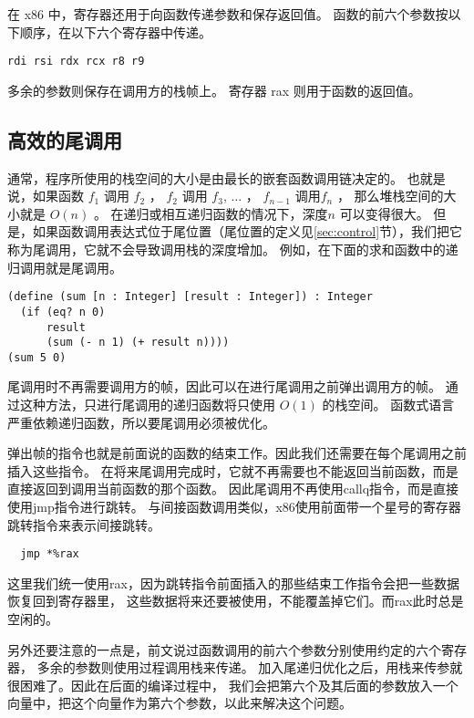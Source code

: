 在 x86 中，寄存器还用于向函数传递参数和保存返回值。
函数的前六个参数按以下顺序，在以下六个寄存器中传递。

\begin{lstlisting}
rdi rsi rdx rcx r8 r9
\end{lstlisting}

多余的参数则保存在调用方的栈帧上。
寄存器 rax 则用于函数的返回值。

\subsection{高效的尾调用}
\label{subsec:tail-call}

通常，程序所使用的栈空间的大小是由最长的嵌套函数调用链决定的。
也就是说，如果函数
$f_1$ 调用 $f_2$ ， $f_2$ 调用 $f_3$, $\ldots$ ， $f_{n-1}$ 调用$f_n$ ，
那么堆栈空间的大小就是 $O(n)$ 。
在递归或相互递归函数的情况下，深度$n$ 可以变得很大。
但是，如果函数调用表达式位于尾位置（尾位置的定义见\ref{sec:control}节），我们把它称为尾调用，它就不会导致调用栈的深度增加。
例如，在下面的求和函数中的递归调用就是尾调用。

\begin{lstlisting}
(define (sum [n : Integer] [result : Integer]) : Integer
  (if (eq? n 0)
      result
      (sum (- n 1) (+ result n))))
(sum 5 0)
\end{lstlisting}

尾调用时不再需要调用方的帧，因此可以在进行尾调用之前弹出调用方的帧。
通过这种方法，只进行尾调用的递归函数将只使用 $O(1)$ 的栈空间。
函数式语言严重依赖递归函数，所以要尾调用必须被优化。

弹出帧的指令也就是前面说的函数的结束工作。因此我们还需要在每个尾调用之前插入这些指令。
在将来尾调用完成时，它就不再需要也不能返回当前函数，而是直接返回到调用当前函数的那个函数。
因此尾调用不再使用callq指令，而是直接使用jmp指令进行跳转。
与间接函数调用类似，x86使用前面带一个星号的寄存器跳转指令来表示间接跳转。
\begin{lstlisting}
  jmp *%rax
\end{lstlisting}
这里我们统一使用rax，因为跳转指令前面插入的那些结束工作指令会把一些数据恢复回到寄存器里，
这些数据将来还要被使用，不能覆盖掉它们。而rax此时总是空闲的。

另外还要注意的一点是，前文说过函数调用的前六个参数分别使用约定的六个寄存器，
多余的参数则使用过程调用栈来传递。
加入尾递归优化之后，用栈来传参就很困难了。因此在后面的编译过程中，
我们会把第六个及其后面的参数放入一个向量中，把这个向量作为第六个参数，以此来解决这个问题。
